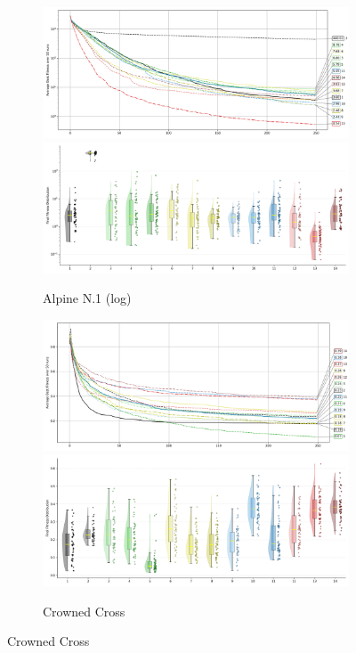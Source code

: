 

\begin{figure}[p]
\renewcommand\thesubfigure{C.\arabic{figure}.\arabic{subfigure}} %
    \centering

    \begin{subfigure}{1\textwidth}
    \centering
    \includegraphics[width=.49\textwidth]{Figures/results/1000/Alpine_N1_All_selected_algorithms_dim1000_annot_legend.png}
    \includegraphics[width=.49\textwidth]{Figures/results/1000/Alpine_N1_all_dim1000_raincloud_vertical.png}
    \caption{Alpine N.1 (log)}
\end{subfigure}

\begin{subfigure}{1\textwidth}
    \centering
    \includegraphics[width=.49\textwidth]{Figures/results/1000/Crowned_Cross_All_selected_algorithms_dim1000_annot_legend.png}
    \includegraphics[width=.49\textwidth]{Figures/results/1000/Crowned_Cross_all_dim1000_raincloud_vertical.png}
    \caption{Crowned Cross}
\end{subfigure}


\end{figure}
